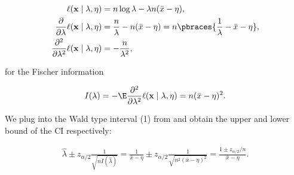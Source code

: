 \begin{solution}
\begin{align*}
    \ell(\mathbf x \mid \lambda, \eta)
    & =
    n \log \lambda - \lambda n (\bar x - \eta), \\
    \frac{\partial}{\partial \lambda}
        \ell(\mathbf x \mid \lambda, \eta)
    & =
    \frac{n}{\lambda} - n (\bar x - \eta)
    =
    n \pbraces{\frac{1}{\lambda} - \bar x - \eta}, \\
    \frac{\partial^2}{\partial \lambda^2}
        \ell(\mathbf x \mid \lambda, \eta)
    & =
    -\frac{n}{\lambda^2},
\end{align*}

for the Fischer information

\begin{align*}
    I(\lambda)
    =
    -\E \frac{\partial^2}{\partial \lambda^2} \ell(\mathbf x \mid \lambda, \eta)
    =
    n (\bar x - \eta)^2.
\end{align*}

We plug into the Wald type interval (1) from \cite[lecture 9, slide 7]{EStat} and obtain the upper and lower bound of the CI respectively:

\begin{align*}
    \hat \lambda \pm z_{\alpha / 2} \frac{1}{\sqrt{n I(\hat \lambda)}}
    =
    \frac{1}{\bar x - \eta} \pm z_{\alpha / 2} \frac{1}{\sqrt{n^2 (\bar x - \eta)^2}}
    =
    \frac{1 \pm z_{\alpha / 2} / n}{\bar x - \eta}.
\end{align*}

\end{solution}

